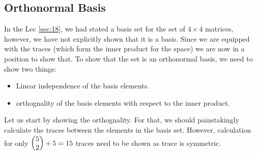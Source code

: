 \subsection{Orthonormal Basis}\label{sec:onb}
In the Lec \ref{sec:18}, we had stated a basis set for the set of $4\times 4$ matrices, however, we have not explicitly shown that it is a basis. Since we are equipped with the traces (which form the inner product for the space) we are now in a position to show that. To show that the set is an orthonormal basis, we need to show two things: 
\begin{itemize}
    \item Linear independence of the basis elements.
    \item orthognality of the basis elements with respect to the inner product.
\end{itemize}
Let us start by showing the orthognality. For that, we should painstakingly calculate the traces between the elements in the basis set. However, calculation for only $\mqty(5\\2) + 5= 15$ traces need to be shown as trace is symmetric. 
